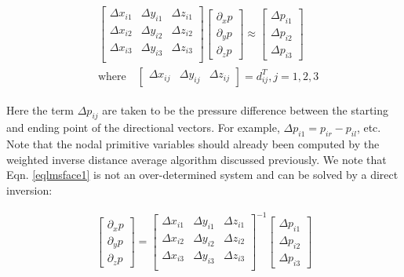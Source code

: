 \documentclass[12pt, letterpaper]{report}
\begin{document}
\begin{align}\label{eqlmsface1}
   \begin{split}
      &\begin{bmatrix}
         \Delta x_{i1} & \Delta y_{i1} & \Delta z_{i1} \\
         \Delta x_{i2} & \Delta y_{i2} & \Delta z_{i2} \\
         \Delta x_{i3} & \Delta y_{i3} & \Delta z_{i3} \\
      \end{bmatrix} \begin{bmatrix}\partial_x p \\ \partial_y p \\ \partial_z p\end{bmatrix} \approx
      \begin{bmatrix}\Delta p_{i1} \\\Delta p_{i2} \\\Delta p_{i3} 
         \end{bmatrix} \\ &\textrm{where} \quad \begin{bmatrix}\Delta x_{ij} & \Delta y_{ij} &
      \Delta z_{ij}\end{bmatrix} = d_{ij}^T, j = 1,2,3
   \end{split}
\end{align}

Here the term $\Delta p_{ij}$ are taken to be the pressure difference between the starting and
ending point of the directional vectors. For example, $\Delta p_{i1} = p_{ir} - p_{il}$, etc. Note
that the nodal primitive variables should already been computed by the weighted inverse distance
average algorithm discussed previously. We note that Eqn. \ref{eqlmsface1} is not an over-determined
system and can be solved by a direct inversion:

\begin{align}\label{eqlmsface2}
   \begin{bmatrix}\partial_x p \\ \partial_y p \\ \partial_z p\end{bmatrix} = 
      \begin{bmatrix}
         \Delta x_{i1} & \Delta y_{i1} & \Delta z_{i1} \\
         \Delta x_{i2} & \Delta y_{i2} & \Delta z_{i2} \\
         \Delta x_{i3} & \Delta y_{i3} & \Delta z_{i3} \\
      \end{bmatrix}^{-1} \begin{bmatrix}\Delta p_{i1} \\\Delta p_{i2} \\\Delta p_{i3}\end{bmatrix}
\end{align}
\end{document}

